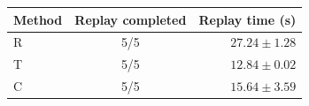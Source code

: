 \begin{tabular}{lcr}
\toprule
Method & Replay completed & Replay time (s) \\
\midrule
R & 5/5 & $27.24 \pm 1.28$ \\
T & 5/5 & $12.84 \pm 0.02$ \\
C & 5/5 & $15.64 \pm 3.59$ \\
\bottomrule
\end{tabular}
